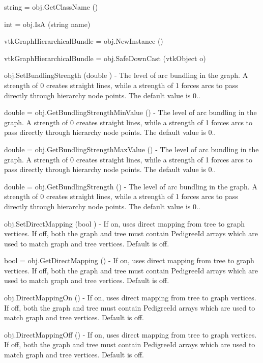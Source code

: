 \begin{DoxyItemize}
\item {\ttfamily string = obj.\-Get\-Class\-Name ()}  
\item {\ttfamily int = obj.\-Is\-A (string name)}  
\item {\ttfamily vtk\-Graph\-Hierarchical\-Bundle = obj.\-New\-Instance ()}  
\item {\ttfamily vtk\-Graph\-Hierarchical\-Bundle = obj.\-Safe\-Down\-Cast (vtk\-Object o)}  
\item {\ttfamily obj.\-Set\-Bundling\-Strength (double )} -\/ The level of arc bundling in the graph. A strength of 0 creates straight lines, while a strength of 1 forces arcs to pass directly through hierarchy node points. The default value is 0..  
\item {\ttfamily double = obj.\-Get\-Bundling\-Strength\-Min\-Value ()} -\/ The level of arc bundling in the graph. A strength of 0 creates straight lines, while a strength of 1 forces arcs to pass directly through hierarchy node points. The default value is 0..  
\item {\ttfamily double = obj.\-Get\-Bundling\-Strength\-Max\-Value ()} -\/ The level of arc bundling in the graph. A strength of 0 creates straight lines, while a strength of 1 forces arcs to pass directly through hierarchy node points. The default value is 0..  
\item {\ttfamily double = obj.\-Get\-Bundling\-Strength ()} -\/ The level of arc bundling in the graph. A strength of 0 creates straight lines, while a strength of 1 forces arcs to pass directly through hierarchy node points. The default value is 0..  
\item {\ttfamily obj.\-Set\-Direct\-Mapping (bool )} -\/ If on, uses direct mapping from tree to graph vertices. If off, both the graph and tree must contain Pedigree\-Id arrays which are used to match graph and tree vertices. Default is off.  
\item {\ttfamily bool = obj.\-Get\-Direct\-Mapping ()} -\/ If on, uses direct mapping from tree to graph vertices. If off, both the graph and tree must contain Pedigree\-Id arrays which are used to match graph and tree vertices. Default is off.  
\item {\ttfamily obj.\-Direct\-Mapping\-On ()} -\/ If on, uses direct mapping from tree to graph vertices. If off, both the graph and tree must contain Pedigree\-Id arrays which are used to match graph and tree vertices. Default is off.  
\item {\ttfamily obj.\-Direct\-Mapping\-Off ()} -\/ If on, uses direct mapping from tree to graph vertices. If off, both the graph and tree must contain Pedigree\-Id arrays which are used to match graph and tree vertices. Default is off.  

\end{DoxyItemize}
